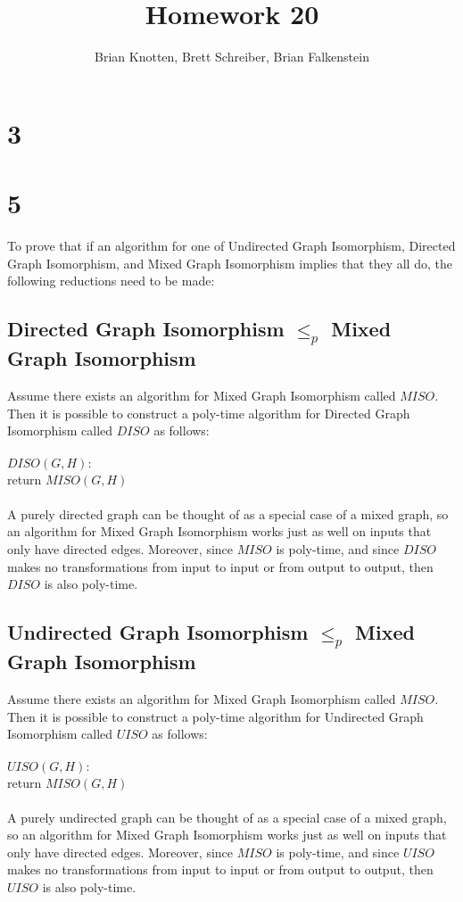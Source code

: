 \documentclass[letterpaper,notitlepage,twoside]{article}
\newcommand\tab[1][1cm]{\hspace*{#1}} %
\begin{document}
\title{Homework 20}
\author{Brian Knotten, Brett Schreiber, Brian Falkenstein}
\maketitle
\section*{3}

\section*{5}
To prove that if an algorithm for one of Undirected Graph Isomorphism, Directed Graph Isomorphism, and Mixed Graph Isomorphism implies that they all do, the following reductions need to be made:

\subsection*{Directed Graph Isomorphism $\leq_p$ Mixed Graph Isomorphism}
Assume there exists an algorithm for Mixed Graph Isomorphism called $MISO$. Then it is possible to construct a poly-time algorithm for Directed Graph Isomorphism called $DISO$ as follows:
\\\\
$DISO(G, H):$\\
\tab return $MISO(G, H)$
\\\\
A purely directed graph can be thought of as a special case of a mixed graph, so an algorithm for Mixed Graph Isomorphism works just as well on inputs that only have directed edges. Moreover, since $MISO$ is poly-time, and since $DISO$ makes no transformations from input to input or from output to output, then $DISO$ is also poly-time.

\subsection*{Undirected Graph Isomorphism $\leq_p$ Mixed Graph Isomorphism}
Assume there exists an algorithm for Mixed Graph Isomorphism called $MISO$. Then it is possible to construct a poly-time algorithm for Undirected Graph Isomorphism called $UISO$ as follows:
\\\\
$UISO(G, H):$\\
\tab return $MISO(G, H)$
\\\\
A purely undirected graph can be thought of as a special case of a mixed graph, so an algorithm for Mixed Graph Isomorphism works just as well on inputs that only have directed edges. Moreover, since $MISO$ is poly-time, and since $UISO$ makes no transformations from input to input or from output to output, then $UISO$ is also poly-time.
\\\\
\end{document}
